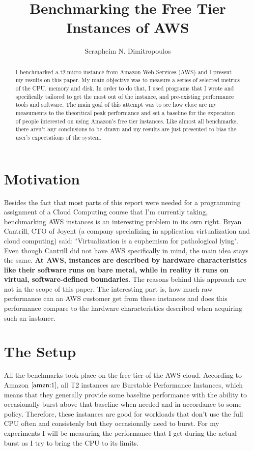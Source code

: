 \documentclass[12pt]{article}
\title{Benchmarking the Free Tier Instances of AWS}
\author{Serapheim N. Dimitropoulos}
\begin{document}
 

\maketitle

\begin{abstract}
I benchmarked a t2.micro instance from Amazon Web Services (AWS)
and I present my results on this paper. My main objective was to
measure a series of selected metrics of the CPU, memory and disk.
In order to do that, I used programs that I wrote and
specifically tailored to get the most out of the instance,
and pre-existing performance tools and software. The main goal
of this attempt was to see how close are my measuments to the
theoritical peak performance and set a baseline for the expecation
of people interested on using Amazon's free tier instances.
Like almost all benchmarks, there aren't any conclusions to
be drawn and my results are just presented to bias the user's
expectations of the system.

\end{abstract}

\section{Motivation}
Besides the fact that most parts of this report were needed for
a programming assignment of a Cloud Computing course that I'm
currently taking, benchmarking AWS instances is an interesting
problem in its own right. Bryan Cantrill, CTO of Joyent (a company
specializing in application virtualization and cloud computing)
said: "Virtualization is a euphemism for pathological lying".
Even though Cantrill did not have AWS specifically in mind,
the main idea stays the same.
\textbf{At AWS, instances are described by hardware characteristics
like their software runs on bare metal, while in reality it runs
on virtual, software-defined boundaries}. The reasons behind
this approach are not in the scope of this paper. The interesting
part is, how much raw performance can an AWS customer get
from these instances and does this performance compare to the
hardware characteristics described when acquiring such an
instance.

\section{The Setup}
All the benchmarks took place on the free tier of the AWS cloud.
According to Amazon $\cite{amzn:1}$, all T2 instances are Burstable
Performance Instances, which means that they generally provide
some baseline performance with the ability to occasionally
burst above that baseline when needed and in accordance to
some policy. Therefore, these instances are good for workloads
that don't use the full CPU often and consistenly but they
occasionally need to burst. For my experiments I will be
measuring the performance that I get during the actual
burst as I try to bring the CPU to its limits.
\end{document}
